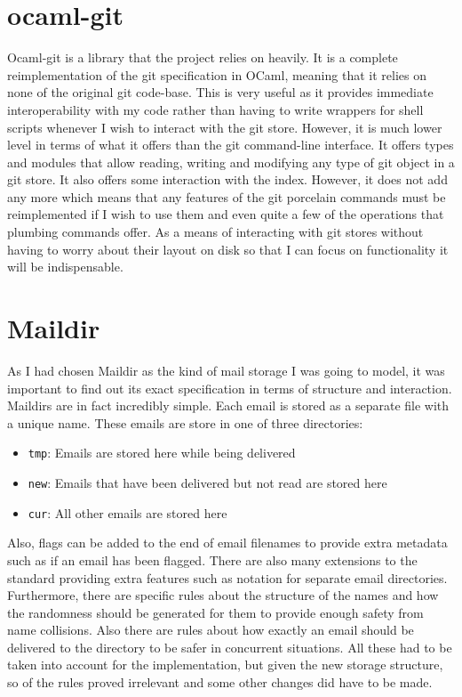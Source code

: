 \section{ocaml-git}

Ocaml-git \cite{ocaml-git} is a library that the project relies on heavily. It is a complete reimplementation of the git specification in OCaml, meaning that it relies on none of the original git code-base. This is very useful as it provides immediate interoperability with my code rather than having to write wrappers for shell scripts whenever I wish to interact with the git store. However, it is much lower level in terms of what it offers than the git command-line interface. It offers types and modules that allow reading, writing and modifying any type of git object in a git store. It also offers some interaction with the index. However, it does not add any more which means that any features of the git porcelain commands must be reimplemented if I wish to use them and even quite a few of the operations that plumbing commands offer. As a means of interacting with git stores without having to worry about their layout on disk so that I can focus on functionality it will be indispensable.

\section{Maildir}

As I had chosen Maildir as the kind of mail storage I was going to model, it was important to find out its exact specification in terms of structure and interaction. Maildirs are in fact incredibly simple. Each email is stored as a separate file with a unique name. These emails are store in one of three directories:

\begin{itemize}
\item \texttt{tmp}: Emails are stored here while being delivered
\item \texttt{new}: Emails that have been delivered but not read are stored here
\item \texttt{cur}: All other emails are stored here
\end{itemize}

Also, flags can be added to the end of email filenames to provide extra metadata such as if an email has been flagged. There are also many extensions to the standard providing extra features such as notation for separate email directories. Furthermore, there are specific rules about the structure of the names and how the randomness should be generated for them to provide enough safety from name collisions. Also there are rules about how exactly an email should be delivered to the directory to be safer in concurrent situations. All these had to be taken into account for the implementation, but given the new storage structure, so of the rules proved irrelevant and some other changes did have to be made.
